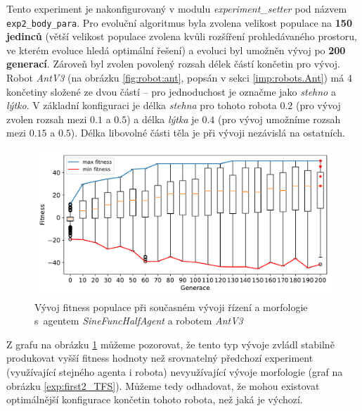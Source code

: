 Tento experiment je nakonfigurovaný v modulu \emph{experiment\_setter} pod
názvem \texttt{exp2\_body\_para}. Pro evoluční algoritmus byla zvolena velikost
populace na \textbf{150 jedinců} (větší velikost populace zvolena kvůli
rozšíření prohledávaného prostoru, ve kterém evoluce hledá optimální řešení) a
evoluci byl umožněn vývoj po \textbf{200 generací}. Zároveň byl zvolen povolený
rozsah délek částí končetin pro vývoj. Robot \emph{AntV3} (na obrázku
\ref{fig:robot:ant}, popsán v sekci \ref{imp:robots.Ant}) má 4 končetiny
složené ze dvou částí -- pro jednoduchost je označme jako \emph{stehno} a
\emph{lýtko}. V základní konfiguraci je délka \emph{stehna} pro tohoto robota
$0.2$ (pro vývoj zvolen rozsah mezi $0.1$ a $0.5$) a délka \emph{lýtka} je
$0.4$ (pro vývoj umožníme rozsah mezi $0.15$ a $0.5$). Délka libovolné části těla je při
vývoji nezávislá na ostatních.

\begin{figure}[h!]
    \includegraphics[width=1\textwidth]{../img/experiment2_para_10ticks.pdf}
    \caption{Vývoj fitness populace při současném vývoji řízení a morfologie
    s~agentem \emph{SineFuncHalfAgent} a robotem \emph{AntV3}}
    \label{exp:exp2_para}
\end{figure}

Z grafu na obrázku \ref{exp:exp2_para} můžeme pozorovat, že tento typ vývoje
zvládl stabilně produkovat vyšší fitness hodnoty než srovnatelný předchozí
experiment (využívající stejného agenta i robota) nevyužívající vývoje
morfologie (graf na obrázku \ref{exp:first2_TFS}). Můžeme tedy odhadovat, že
mohou existovat optimálnější konfigurace končetin tohoto robota, než jaká je
výchozí.

